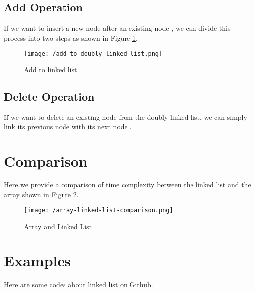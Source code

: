 \subsection{Add Operation}
\label{sec:add-operation}

If we want to insert a new node  after an existing node , we can divide this process into two steps as shown in Figure \ref{fig:add-to-doubly-linked-list}.
\begin{figure}[!ht]
  \centering
  \texttt{[image: /add-to-doubly-linked-list.png]}
  \caption{Add to linked list}
  \label{fig:add-to-doubly-linked-list}
\end{figure}



\subsection{Delete Operation}
\label{sec:delete-operation}

If we want to delete an existing node  from the doubly linked list, we can simply link its previous node  with its next node .



\section{Comparison}
\label{sec:comparison}



Here we provide a comparison of time complexity between the linked list and the array shown in Figure \ref{fig:array-and-linked-list}.
\begin{figure}[!ht]
  \centering
  \texttt{[image: /array-linked-list-comparison.png]}
  \caption{Array and Linked List}
  \label{fig:array-and-linked-list}
\end{figure}


\section{Examples}
\label{sec:examples}


Here are some codes about linked list on \href{https://github.com/mingmingli916/algorithms/tree/main/linked_list}{Github}.



